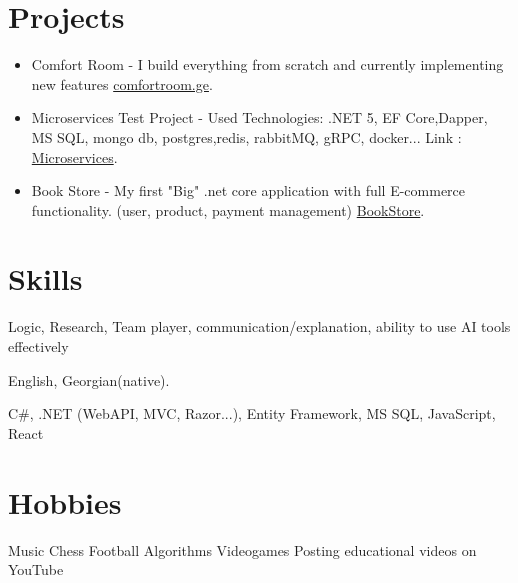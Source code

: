 \documentclass[11pt]{article}
\begin{document}
\section{Projects}

\begin{itemize}
\item Comfort Room - I build everything from scratch and currently implementing new features 
\href{https://comfortroom.ge }{comfortroom.ge}. 
\item Microservices Test Project - Used Technologies: .NET 5, EF Core,Dapper, MS SQL, mongo db, postgres,redis, rabbitMQ, gRPC, docker... Link : \href{https://github.com/Vazhadval/MicroservicesProject}{Microservices}.
\item Book Store - My first "Big" .net core application with full E-commerce functionality. (user, product, payment management) \href{https://www.github.com/Vazhadval/BookStore}{BookStore}.


\end{itemize}



\section{Skills}

\begin{description}[widest=Langauges]
\item[Personal:] Logic, Research, Team player, communication/explanation, ability to use AI tools effectively 
\item[Languages:]	English, Georgian(native).
\item [Tech Stack:] C\#, .NET (WebAPI, MVC, Razor...), Entity Framework, MS SQL, JavaScript, React
\end{description}

\vspace{3mm}
\section{Hobbies}
  \faMusic \hspace{1mm} Music\hspace{1mm} 
  \faChessKnight \hspace{1mm} Chess \hspace{1mm} 
  \faFutbol \hspace{1mm} Football \hspace{1mm} 
  \faCode \hspace{1mm} Algorithms \hspace{1mm} 
  \faGamepad \hspace{1mm} Videogames \hspace{1mm} 
  \faYoutube \hspace{1mm} Posting educational videos on YouTube
\end{document}
